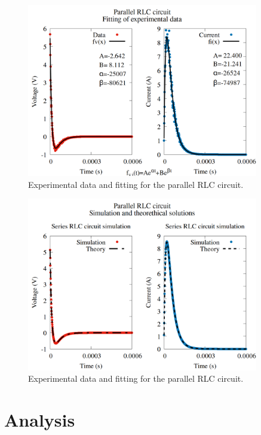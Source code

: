 \documentclass[12pt,twoside]{extarticle}
\begin{document}
\begin{figure}[ht]
    \centering
    \includegraphics[width=0.9\textwidth]{figures/parallel_exp_vs_fitting.png}
    \caption{Experimental data and fitting for the parallel RLC circuit.}
    \label{fig:parallel_evf}
\end{figure}

\begin{figure}[ht]
    \centering
    \includegraphics[width=0.9\textwidth]{figures/parallel_sim_vs_ana.png}
    \caption{Experimental data and fitting for the parallel RLC circuit.}
    \label{fig:parallel_sva}
\end{figure}




\section{Analysis}
\end{document}
